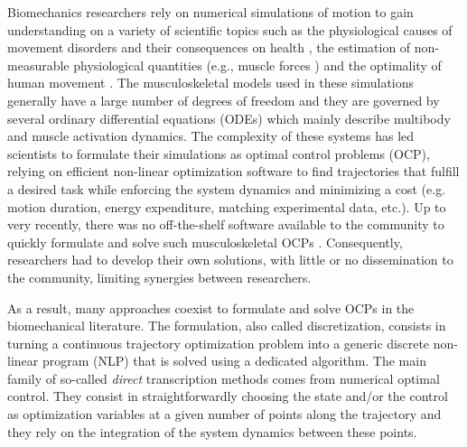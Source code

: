Biomechanics researchers rely on numerical simulations of motion to gain understanding on a variety of scientific topics such as the physiological causes of movement disorders and their consequences on health \cite{pizzolato2015ceinms}, the estimation of non-measurable physiological quantities (e.g., muscle forces \cite{bailly2020real}) and the optimality of human movement \cite{porsa2016direct}.
The musculoskeletal models used in these simulations generally have a large number of degrees of freedom and they are governed by several ordinary differential equations (ODEs) which mainly describe multibody and muscle activation dynamics.
The complexity of these systems has led scientists to formulate their simulations as optimal control problems (OCP), relying on efficient non-linear optimization software to find trajectories that fulfill a desired task while enforcing the system dynamics and minimizing a cost (e.g. motion duration, energy expenditure, matching experimental data, etc.).
Up to very recently, there was no off-the-shelf software available to the community to quickly formulate and solve such musculoskeletal OCPs \cite{Charles2013}. 
Consequently, researchers had to develop their own solutions, with little or no dissemination to the community, limiting  synergies between researchers.


As a result, many approaches coexist to formulate and solve OCPs in the biomechanical literature. 
The formulation, also called discretization, consists in turning a continuous trajectory optimization problem into a generic discrete non-linear program (NLP) that is solved using a dedicated algorithm. 
The main family of so-called \textit{direct} transcription methods comes from numerical optimal control. 
They consist in straightforwardly choosing the state and/or the control as optimization variables at a given number of points along the trajectory and they rely on the integration of the system dynamics between these points. 

